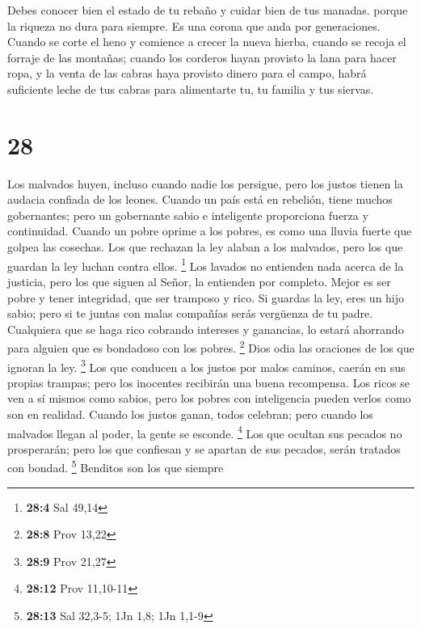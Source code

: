  Debes conocer bien el estado de tu rebaño y cuidar bien de
tus manadas.  porque la riqueza no dura para siempre. Es
una corona que anda por generaciones.  Cuando se corte el
heno y comience a crecer la nueva hierba, cuando se recoja el forraje de
las montañas;  cuando los corderos hayan provisto la lana
para hacer ropa, y la venta de las cabras haya provisto dinero para el
campo,  habrá suficiente leche de tus cabras para
alimentarte tu, tu familia y tus siervas.

\hypertarget{section-27}{%
\section{28}\label{section-27}}

 Los malvados huyen, incluso cuando nadie los persigue, pero
los justos tienen la audacia confiada de los leones.  Cuando
un país está en rebelión, tiene muchos gobernantes; pero un gobernante
sabio e inteligente proporciona fuerza y continuidad. 
Cuando un pobre oprime a los pobres, es como una lluvia fuerte que
golpea las cosechas.  Los que rechazan la ley alaban a los
malvados, pero los que guardan la ley luchan contra ellos. \footnote{\textbf{28:4}
  Sal 49,14}  Los lavados no entienden nada acerca de la
justicia, pero los que siguen al Señor, la entienden por completo.
 Mejor es ser pobre y tener integridad, que ser tramposo y
rico.  Si guardas la ley, eres un hijo sabio; pero si te
juntas con malas compañías serás vergüenza de tu padre. 
Cualquiera que se haga rico cobrando intereses y ganancias, lo estará
ahorrando para alguien que es bondadoso con los pobres. \footnote{\textbf{28:8}
  Prov 13,22}  Dios odia las oraciones de los que ignoran la
ley. \footnote{\textbf{28:9} Prov 21,27}  Los que conducen
a los justos por malos caminos, caerán en sus propias trampas; pero los
inocentes recibirán una buena recompensa.  Los ricos se ven
a sí mismos como sabios, pero los pobres con inteligencia pueden verlos
como son en realidad.  Cuando los justos ganan, todos
celebran; pero cuando los malvados llegan al poder, la gente se esconde.
\footnote{\textbf{28:12} Prov 11,10-11}  Los que ocultan
sus pecados no prosperarán; pero los que confiesan y se apartan de sus
pecados, serán tratados con bondad. \footnote{\textbf{28:13} Sal 32,3-5;
  1Jn 1,8; 1Jn 1,1-9}  Benditos son los que siempre
